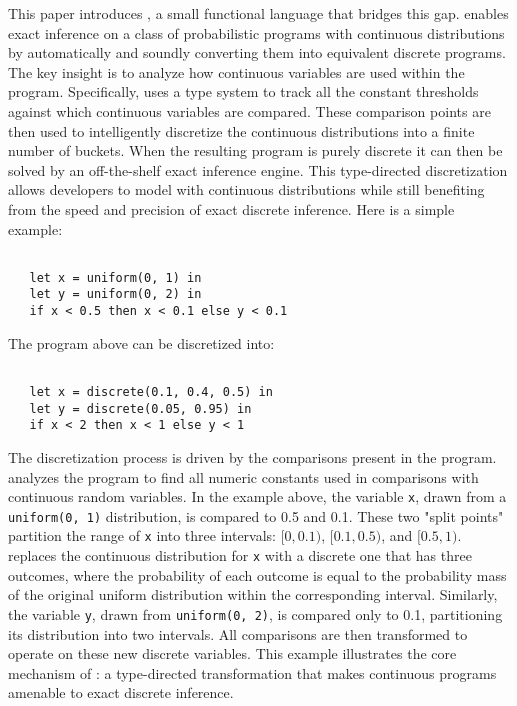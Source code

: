 \documentclass[acmsmall,screen,dvipsnames,x11names,nonacm,anonymous,review]{acmart}
\newcommand{\Slice}{\text{\scshape Slice}\xspace}
\begin{document}
This paper introduces \Slice, a small functional language that bridges this gap. \Slice enables exact inference on a class of probabilistic programs with continuous distributions by automatically and soundly converting them into equivalent discrete programs. The key insight is to analyze how continuous variables are used within the program. Specifically, \Slice uses a type system to track all the constant thresholds against which continuous variables are compared. These comparison points are then used to intelligently discretize the continuous distributions into a finite number of buckets. When the resulting program is purely discrete it can then be solved by an off-the-shelf exact inference engine. This type-directed discretization allows developers to model with continuous distributions while still benefiting from the speed and precision of exact discrete inference. Here is a simple example:

\begin{lstlisting}

   let x = uniform(0, 1) in
   let y = uniform(0, 2) in
   if x < 0.5 then x < 0.1 else y < 0.1

\end{lstlisting}\vspace{1em}

\noindent The program above can be discretized into:

\begin{lstlisting}

   let x = discrete(0.1, 0.4, 0.5) in
   let y = discrete(0.05, 0.95) in
   if x < 2 then x < 1 else y < 1

\end{lstlisting}\vspace{1em}

The discretization process is driven by the comparisons present in the program. \Slice analyzes the program to find all numeric constants used in comparisons with continuous random variables. In the example above, the variable \texttt{x}, drawn from a \texttt{uniform(0, 1)} distribution, is compared to 0.5 and 0.1. These two "split points" partition the range of \texttt{x} into three intervals: $[0, 0.1)$, $[0.1, 0.5)$, and $[0.5, 1)$. \Slice replaces the continuous distribution for \texttt{x} with a discrete one that has three outcomes, where the probability of each outcome is equal to the probability mass of the original uniform distribution within the corresponding interval. Similarly, the variable \texttt{y}, drawn from \texttt{uniform(0, 2)}, is compared only to 0.1, partitioning its distribution into two intervals. All comparisons are then transformed to operate on these new discrete variables. This example illustrates the core mechanism of \Slice: a type-directed transformation that makes continuous programs amenable to exact discrete inference.
\end{document}
